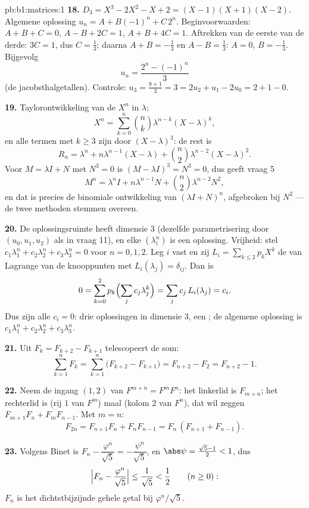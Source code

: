 \begin{solution}{pb:b1:matrices:1}
\textbf{18.} $D_3 = X^3 - 2X^2 - X + 2 = (X-1)(X+1)(X-2)$.
Algemene oplossing $u_n = A + B(-1)^n + C\,2^n$.
Beginvoorwaarden: $A + B + C = 0$, $A - B + 2C = 1$, $A + B + 4C =
1$. Aftrekken van de eerste van de derde: $3C = 1$, dus $C =
\frac13$; daarna $A + B = -\frac13$ en $A - B = \frac13$: $A = 0$,
$B = -\frac13$. Bijgevolg
\[
u_n = \frac{2^n - (-1)^n}{3}
\]
(de jacobsthalgetallen). Controle: $u_3 = \frac{8 + 1}{3} = 3 =
2u_2 + u_1 - 2u_0 = 2 + 1 - 0$.

\textbf{19.} Taylorontwikkeling van de  $X^n$ in
$\lambda$:
\[
X^n = \sum_{k=0}^{n} \binom nk \lambda^{n-k}(X - \lambda)^k ,
\]
en alle termen met $k \geq 3$ zijn  door $(X -
\lambda)^3$: de rest is
\[
R_n = \lambda^n + n\lambda^{n-1}(X - \lambda) + \binom
n2\lambda^{n-2}(X - \lambda)^2 .
\]
Voor $M = \lambda I + N$ met $N^3 = 0$ is $(M - \lambda I)^3 = N^3
= 0$, dus geeft vraag 5
\[
M^n = \lambda^n I + n\lambda^{n-1} N + \binom n2
\lambda^{n-2} N^2 ,
\]
en dat is precies de binomiale ontwikkeling van $(\lambda I +
N)^n$, afgebroken bij $N^2$ --- de twee methoden stemmen overeen.

\textbf{20.} De oplossingsruimte heeft dimensie $3$ (dezelfde
parametrisering door $(u_0, u_1, u_2)$ als in vraag 11), en elke
$(\lambda_i^n)$ is een oplossing. Vrijheid: stel
$c_1\lambda_1^n + c_2\lambda_2^n + c_3\lambda_3^n = 0$ voor $n = 0,
1, 2$. Leg $i$ vast en zij $L_i = \sum_{k \leq 2} p_k X^k$ de
 van Lagrange van de knooppunten met $L_i(\lambda_j) =
\delta_{ij}$. Dan is
\[
0 = \sum_{k=0}^{2} p_k\Bigl(\sum_j c_j\lambda_j^k\Bigr)
= \sum_j c_j\,L_i(\lambda_j) = c_i .
\]
Dus zijn alle $c_i = 0$: drie  oplossingen in dimensie $3$,
een ; de algemene oplossing is $c_1\lambda_1^n +
c_2\lambda_2^n + c_3\lambda_3^n$.

\textbf{21.} Uit $F_k = F_{k+2} - F_{k+1}$ telescopeert de som:
\[
\sum_{k=1}^{n} F_k = \sum_{k=1}^{n}\bigl(F_{k+2} - F_{k+1}\bigr)
= F_{n+2} - F_2 = F_{n+2} - 1 .
\]

\textbf{22.} Neem de ingang $(1,2)$ van $F^{m+n} = F^m F^n$: het
linkerlid is $F_{m+n}$; het rechterlid is (rij $1$ van $F^m$) maal
(kolom $2$ van $F^n$), dat wil zeggen $F_{m+1}F_n + F_m F_{n-1}$.
Met $m = n$:
\[
F_{2n} = F_{n+1}F_n + F_nF_{n-1} = F_n\,(F_{n+1} + F_{n-1}).
\]

\textbf{23.} Volgens Binet is $F_n - \dfrac{\varphi^n}{\sqrt5} =
-\dfrac{\psi^n}{\sqrt5}$, en $\abs\psi = \frac{\sqrt5 - 1}2 < 1$,
dus
\[
\Bigl|F_n - \frac{\varphi^n}{\sqrt5}\Bigr|
\leq \frac{1}{\sqrt5} < \frac12
\qquad (n \geq 0):
\]
$F_n$ is het dichtstbijzijnde gehele getal bij
$\varphi^n/\sqrt5$.


\end{solution}
